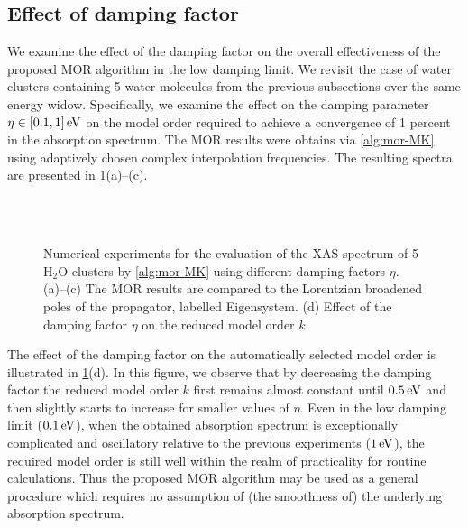 \subsection{Effect of damping factor}
\label{sec:MORbroad}

We examine the effect of the damping factor on the overall effectiveness of the proposed MOR algorithm in the low damping limit. We revisit the case of water clusters containing 5 water molecules from the previous subsections over the same energy widow. Specifically, we examine the effect on the damping parameter $\eta\in[0.1,1]\,\mathrm{eV}$ on the model order required to achieve a convergence of 1 percent in the absorption spectrum. The MOR results were obtains via \cref{alg:mor-MK} using adaptively chosen complex interpolation frequencies. The resulting spectra are presented in \cref{fig:damping}(a)--(c).

\begin{figure}[hbtp]
\centering
{}%
%
\\[10pt]
%
%
\\[10pt]
\caption{Numerical experiments for the evaluation of the XAS spectrum of 5 H$_2$O clusters by \cref{alg:mor-MK} using different damping factors $\eta$. (a)--(c) The MOR results are compared to the Lorentzian broadened poles of the propagator, labelled Eigensystem. (d) Effect of the damping factor $\eta$ on the reduced model order $k$.}
\label{fig:damping}
\end{figure}

The effect of the damping factor on the automatically selected model order is illustrated in \cref{fig:damping}(d). In this figure, we observe that by decreasing the damping factor the reduced model order $k$ first remains almost constant until $0.5\,\mathrm{eV}$ and then slightly starts to increase for smaller values of $\eta$. Even in the low damping limit ($0.1\,\mathrm{eV}$), when the obtained absorption spectrum is exceptionally complicated and oscillatory relative to the previous experiments ($1\,\mathrm{eV}$), the required model order is still well within the realm of practicality for routine calculations. Thus the proposed MOR algorithm may be used as a general procedure which requires no assumption of (the smoothness of) the underlying absorption spectrum.


